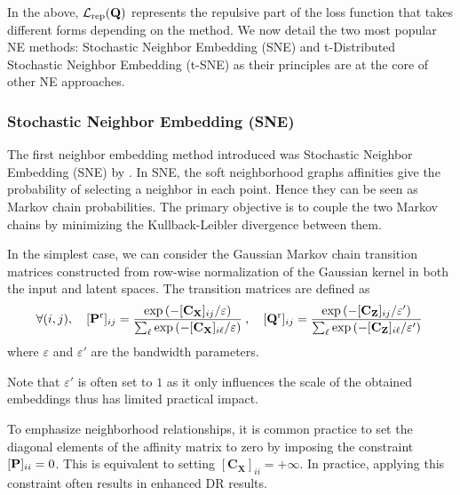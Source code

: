 In the above, \(\mathcal{L}_{\mathrm{rep}}({\mathbf{Q}})\) represents the repulsive part of the loss function that takes different forms depending on the method. We now detail the two most popular NE methods: Stochastic Neighbor Embedding (SNE) and t-Distributed Stochastic Neighbor Embedding (t-SNE) as their principles are at the core of other NE approaches.

\subsubsection{Stochastic Neighbor Embedding (SNE)}

The first neighbor embedding method introduced was Stochastic Neighbor Embedding (SNE) by \cite{hinton2002stochastic}. In SNE, the soft neighborhood graphs affinities give the probability of selecting a neighbor in each point. Hence they can be seen as Markov chain probabilities. The primary objective is to couple the two Markov chains by minimizing the Kullback-Leibler divergence between them. 

In the simplest case, we can consider the Gaussian Markov chain transition matrices constructed from row-wise normalization of the Gaussian kernel in both the input and latent spaces. The transition matrices are defined as
\begin{align}
    \forall (i,j), \quad [{\mathbf{P}}^{\mathrm{r}}]_{ij} = \frac{\exp{(-[{\mathbf{C}}_{{\mathbf{X}}}]_{ij} / \varepsilon)}}{\sum_\ell \exp{(-[{\mathbf{C}}_{{\mathbf{X}}}]_{i\ell} / \varepsilon)} } \:, \quad [{\mathbf{Q}}^{\mathrm{r}}]_{ij} = \frac{\exp{(-[{\mathbf{C}}_{{\mathbf{Z}}}]_{ij} / \varepsilon')}}{\sum_\ell \exp{(-[{\mathbf{C}}_{{\mathbf{Z}}}]_{i\ell} / \varepsilon')}} \,
\end{align}
where $\varepsilon$ and $\varepsilon'$ are the bandwidth parameters.

\begin{remark}
    Note that $\varepsilon'$ is often set to $1$ as it only influences the scale of the obtained embeddings thus has limited practical impact.
\end{remark}

\begin{remark}
    To emphasize neighborhood relationships, it is common practice to set the diagonal elements of the affinity matrix to zero by imposing the constraint $[{\mathbf{P}}]_{ii} = 0$. This is equivalent to setting $[\mathbf{C}_{\mathbf{X}}]_{ii} = + \infty$. In practice, applying this constraint often results in enhanced DR results.
\end{remark}
    


